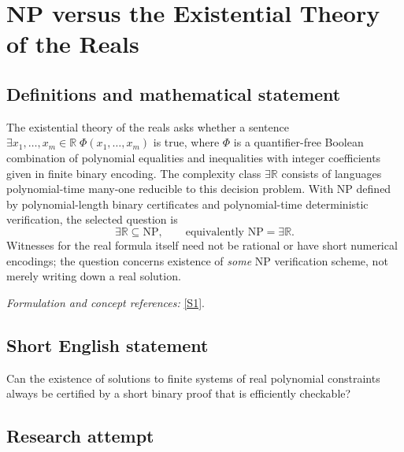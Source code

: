 \documentclass[11pt,a4paper]{article}
\newcommand{\R}{\mathbb{R}}
\newcommand{\sref}[2]{\hyperlink{source:#1:#2}{[S#2]}}
\newif\ifshowcatalogue
\newcommand{\cataloguescope}[1]{\ifshowcatalogue
 \paragraph{Exact scope in the supplied catalogue.}
 \begin{quote}\small #1\end{quote}\fi}
\numberwithin{equation}{section}
\begin{document}
\setcounter{section}{0}
\clearpage
\section*{\texorpdfstring{NP versus the Existential Theory of the Reals}{NP versus the Existential Theory of the Reals}}\label{statement}
\subsection{Definitions and mathematical statement}
The existential theory of the reals asks whether a sentence
$\exists x_1,\ldots,x_m\in\R\;\Phi(x_1,\ldots,x_m)$ is true, where $\Phi$ is a quantifier-free Boolean combination of polynomial equalities and inequalities with integer coefficients given in finite binary encoding. The complexity class $\exists\R$ consists of languages polynomial-time many-one reducible to this decision problem. With $\mathrm{NP}$ defined by polynomial-length binary certificates and polynomial-time deterministic verification, the selected question is
\[
 \exists\R\subseteq\mathrm{NP},\qquad\text{equivalently }\mathrm{NP}=\exists\R.
\]
Witnesses for the real formula itself need not be rational or have short numerical encodings; the question concerns existence of \emph{some} NP verification scheme, not merely writing down a real solution.
\par\smallskip\textit{Formulation and concept references:} \sref{statement}{1}.
\cataloguescope{Determine whether every problem decidable in the existential theory of the reals (exists R) can be decided in nondeterministic polynomial time, i.e., decide whether NP = exists R.}
\subsection{Short English statement}
Can the existence of solutions to finite systems of real polynomial constraints always be certified by a short binary proof that is efficiently checkable?
\subsection{Research attempt}
\end{document}
